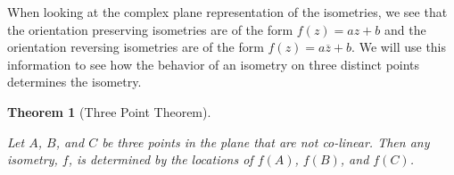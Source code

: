 \documentclass[
]{book}
\newtheorem{theorem}{Theorem}[chapter]
\theoremstyle{definition}
\theoremstyle{definition}
\theoremstyle{definition}
\theoremstyle{definition}
\theoremstyle{remark}
\begin{document}
When looking at the complex plane representation of the isometries, we see that the orientation preserving isometries are of the form \(f(z)=az+b\) and the orientation reversing isometries are of the form \(f(z)=a\overline{z}+b\). We will use this information to see how the behavior of an isometry on three distinct points determines the isometry.

\begin{theorem}[Three Point Theorem]
\protect\hypertarget{thm:unlabeled-div-287}{}\label{thm:unlabeled-div-287}

Let \(A\), \(B\), and \(C\) be three points in the plane that are not co-linear. Then any isometry, \(f\), is determined by the locations of \(f(A)\), \(f(B)\), and \(f(C)\).

\end{theorem}
\end{document}
